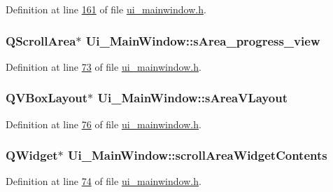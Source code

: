 Definition at line \hyperlink{a00139_source_l00161}{161} of file \hyperlink{a00139_source}{ui\+\_\+mainwindow.\+h}.

\hypertarget{a00080_ae4fe44aa026dd0e84e0f10cdcabca504}{
\subsubsection[{s\+Area\+\_\+progress\+\_\+view}]{\setlength{\rightskip}{0pt plus 5cm}Q\+Scroll\+Area$\ast$ Ui\+\_\+\+Main\+Window\+::s\+Area\+\_\+progress\+\_\+view}}\label{a00080_ae4fe44aa026dd0e84e0f10cdcabca504}


Definition at line \hyperlink{a00139_source_l00073}{73} of file \hyperlink{a00139_source}{ui\+\_\+mainwindow.\+h}.

\hypertarget{a00080_a2bdce9ad313cd4ee575613f36cbc4678}{
\subsubsection[{s\+Area\+V\+Layout}]{\setlength{\rightskip}{0pt plus 5cm}Q\+V\+Box\+Layout$\ast$ Ui\+\_\+\+Main\+Window\+::s\+Area\+V\+Layout}}\label{a00080_a2bdce9ad313cd4ee575613f36cbc4678}


Definition at line \hyperlink{a00139_source_l00076}{76} of file \hyperlink{a00139_source}{ui\+\_\+mainwindow.\+h}.

\hypertarget{a00080_aa70fc2af9f9ea3b686db12823c5deb47}{
\subsubsection[{scroll\+Area\+Widget\+Contents}]{\setlength{\rightskip}{0pt plus 5cm}Q\+Widget$\ast$ Ui\+\_\+\+Main\+Window\+::scroll\+Area\+Widget\+Contents}}\label{a00080_aa70fc2af9f9ea3b686db12823c5deb47}


Definition at line \hyperlink{a00139_source_l00074}{74} of file \hyperlink{a00139_source}{ui\+\_\+mainwindow.\+h}.

